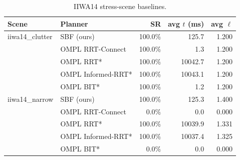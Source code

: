 \begin{table}[t]
\centering
\caption{IIWA14 stress-scene baselines.}
\label{tab:newscenes}
\scriptsize
\setlength{\tabcolsep}{3pt}
\begin{tabular}{llrrr}
  \toprule
  Scene & Planner & SR & avg $t$ (ms) & avg $\ell$ \\
  \midrule
  iiwa14\_clutter & SBF (ours) & 100.0\% & 125.7 & 1.200 \\
   & OMPL RRT-Connect & 100.0\% & 1.3 & 1.200 \\
   & OMPL RRT* & 100.0\% & 10042.7 & 1.200 \\
   & OMPL Informed-RRT* & 100.0\% & 10043.1 & 1.200 \\
   & OMPL BIT* & 100.0\% & 1.2 & 1.200 \\
  iiwa14\_narrow & SBF (ours) & 100.0\% & 125.3 & 1.400 \\
   & OMPL RRT-Connect & 0.0\% & 0.0 & 0.000 \\
   & OMPL RRT* & 100.0\% & 10039.9 & 1.331 \\
   & OMPL Informed-RRT* & 100.0\% & 10037.4 & 1.325 \\
   & OMPL BIT* & 0.0\% & 0.0 & 0.000 \\
  \bottomrule
\end{tabular}
\end{table}

